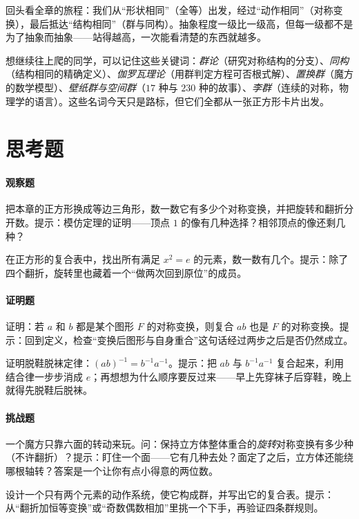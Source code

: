 回头看全章的旅程：我们从“形状相同”（全等）出发，经过“动作相同”（对称变换），最后抵达“结构相同”（群与同构）。抽象程度一级比一级高，但每一级都不是为了抽象而抽象——站得越高，一次能看清楚的东西就越多。

\begin{pandeng}
想继续往上爬的同学，可以记住这些关键词：\emph{群论}（研究对称结构的分支）、\emph{同构}（结构相同的精确定义）、\emph{伽罗瓦理论}（用群判定方程可否根式解）、\emph{置换群}（魔方的数学模型）、\emph{壁纸群与空间群}（$17$ 种与 $230$ 种的故事）、\emph{李群}（连续的对称，物理学的语言）。这些名词今天只是路标，但它们全都从一张正方形卡片出发。
\end{pandeng}

\section*{思考题}

\paragraph{观察题}
\begin{sikao}
  \item 把本章的正方形换成等边三角形，数一数它有多少个对称变换，并把旋转和翻折分开数。提示：模仿定理的证明——顶点 $1$ 的像有几种选择？相邻顶点的像还剩几种？
  \item 在正方形的复合表中，找出所有满足 $x^2=e$ 的元素，数一数有几个。提示：除了四个翻折，旋转里也藏着一个“做两次回到原位”的成员。
\end{sikao}

\paragraph{证明题}
\begin{sikao}
  \item 证明：若 $a$ 和 $b$ 都是某个图形 $F$ 的对称变换，则复合 $ab$ 也是 $F$ 的对称变换。提示：回到定义，检查“变换后图形与自身重合”这句话经过两步之后是否仍然成立。
  \item 证明脱鞋脱袜定律：$(ab)^{-1}=b^{-1}a^{-1}$。提示：把 $ab$ 与 $b^{-1}a^{-1}$ 复合起来，利用结合律一步步消成 $e$；再想想为什么顺序要反过来——早上先穿袜子后穿鞋，晚上就得先脱鞋后脱袜。
\end{sikao}

\paragraph{挑战题}
\begin{sikao}
  \item 一个魔方只靠六面的转动来玩。问：保持立方体整体重合的\emph{旋转}对称变换有多少种（不许翻折）？提示：盯住一个面——它有几种去处？面定了之后，立方体还能绕哪根轴转？答案是一个让你有点小得意的两位数。
  \item 设计一个只有两个元素的动作系统，使它构成群，并写出它的复合表。提示：从“翻折加恒等变换”或“奇数偶数相加”里挑一个下手，再验证四条群规则。
\end{sikao}

